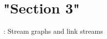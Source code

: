 \chapter{"{}\+Section 3"{}}
\hypertarget{SECTION_3}{}\label{SECTION_3}
\+: Stream graphs and link streams 